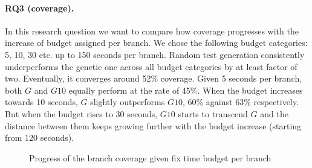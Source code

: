 \documentclass[sigconf,review, anonymous]{acmart}
\newcommand{\Random}{\mathbb{R}}
\newcommand{\Genetic}{\mathbb{G}}
\newcommand{\RGenetic}{\mathbb{G}_{10}}
\begin{document}
\paragraph{\textbf{RQ3 (coverage).}} In this research question we want to compare how coverage progresses with the increase of budget assigned per branch. We chose the following budget categories: 5, 10, 30 etc. up to 150 seconds per branch. Random test generation consistently underperforms the genetic one across all budget categories by at least factor of two. Eventually, it converges around 52\% coverage. Given 5 seconds per branch, both $G$ and $G10$ equally perform at the rate of 45\%. When the budget increases towards 10 seconds, $G$ slightly outperforms $G10$, 60\% against 63\% respectively. But when the budget rises to 30 seconds, $G10$ starts to transcend $G$ and the distance between them keeps growing further with the budget increase (starting from 120 seconds).  

\begin{figure}[!t]
  \caption{Progress of the branch coverage given fix time budget per branch}
    \label{fig:2}
\end{figure}
\end{document}
